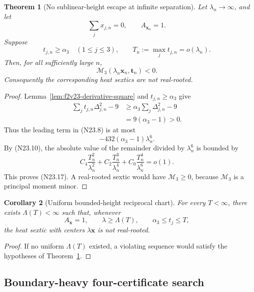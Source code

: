 \documentclass[11pt]{article}
\newtheorem{theorem}{Theorem}[section]
\newtheorem{corollary}[theorem]{Corollary}
\theoremstyle{definition}
\theoremstyle{remark}
\begin{document}
\begin{theorem}[No sublinear-height escape at infinite separation]
\label{thm:f2v23-no-sublinear-escape}
Let \(\lambda_n\to\infty\), and let
\[
 \sum_jx_{j,n}=0,\qquad A_{\bm x_n}=1.
 \tag{N23.15}
\]
Suppose
\[
 t_{j,n}\geq\alpha_3
 \quad(1\leq j\leq3),\qquad
 T_n:=\max_jt_{j,n}=o(\lambda_n).
 \tag{N23.16}
\]
Then, for all sufficiently large \(n\),
\[
 \mathcal M_3(\lambda_n\bm x_n,\bm t_n)<0.
 \tag{N23.17}
\]
Consequently the corresponding heat sextics are not real-rooted.
\end{theorem}

\begin{proof}
Lemma~\ref{lem:f2v23-derivative-square} and
\(t_{j,n}\geq\alpha_3\) give
\[
\begin{aligned}
 \sum_jt_{j,n}\Delta_{j,n}^2-9
 &\geq\alpha_3\sum_j\Delta_{j,n}^2-9\\
 &=9(\alpha_3-1)>0.
\end{aligned}
\tag{N23.18}
\]
Thus the leading term in \textup{(N23.8)} is at most
\[
 -432(\alpha_3-1)\lambda_n^6.
 \tag{N23.19}
\]
By \textup{(N23.10)}, the absolute value of the remainder divided by
\(\lambda_n^6\) is bounded by
\[
 C_4\frac{T_n^2}{\lambda_n^2}
 +C_2\frac{T_n^3}{\lambda_n^4}
 +C_0\frac{T_n^4}{\lambda_n^6}=o(1).
 \tag{N23.20}
\]
This proves \textup{(N23.17)}.  A real-rooted sextic would have
\(\mathcal M_3\geq0\), because \(\mathcal M_3\) is a principal moment
minor.
\end{proof}

\begin{corollary}[Uniform bounded-height reciprocal chart]
\label{cor:f2v23-bounded-height}
For every \(T<\infty\), there exists \(\Lambda(T)<\infty\) such that,
whenever
\[
 A_{\bm x}=1,\qquad
 \lambda\geq\Lambda(T),\qquad
 \alpha_3\leq t_j\leq T,
 \tag{N23.21}
\]
the heat sextic with centers \(\lambda\bm x\) is not real-rooted.
\end{corollary}

\begin{proof}
If no uniform \(\Lambda(T)\) existed, a violating sequence would satisfy
the hypotheses of Theorem~\ref{thm:f2v23-no-sublinear-escape}.
\end{proof}

\subsection{Boundary-heavy four-certificate search}
\label{subsec:f2v23-search}
\end{document}
